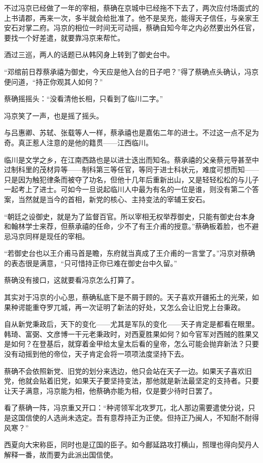 不过冯京已经做了一年的宰相，蔡确在京城中已经拖不下去了，两次应付场面式的上书请郡，再来一次，多半就会给批准了。他不是吴充，能得天子信任，与亲家王安石对掌二府。冯京的相位一时间无可动摇，蔡确自知今年之内必然要出外任官，要找一个好差遣，就要靠冯京来帮忙。

酒过三巡，两人的话题已从韩冈身上转到了御史台中。

“邓绾前日荐蔡承禧为御史，今天应是他入台的日子吧？”得了蔡确点头确认，冯京便问道，“持正你观其人如何？”

蔡确摇摇头：“没看清他长相，只看到了临川二字。”

冯京笑了一声，也是摇了摇头。

与吕惠卿、苏轼、张载等人一样，蔡承禧也是嘉佑二年的进士。不过这一点不足为奇。真正惹人注意的是他的籍贯——江西临川。

临川是文学之乡，在江南西路也是以进士迭出而知名。蔡承禧的父亲蔡元导甚至中过制科里的茂材异等——制科第三等任官，等同于进士科状元，难度可想而知——只是因为触犯律条而被夺了功名，但他十几年后重新出山，又是轻轻松松的与儿子一起考上了进士。可如今一旦说起临川人中最为有名的一位是谁，则没有第二个答案，当然就是当今的首相，新党的核心、主持变法的宰辅王安石。

“朝廷之设御史，就是为了监督百官。所以宰相无权举荐御史，只能有御史台本身和翰林学士来荐，但蔡承禧的任命，少不了有王介甫的授意。”蔡确板着脸，也不避忌冯京同样是现任的宰相。

“若御史台也以王介甫马首是瞻，东府就当真成了王介甫的一言堂了。”冯京对蔡确的表态很是满意，“只可惜持正你已难在御史台中久留。”

蔡确没有接口，这就要看冯京怎么打算了。

其实对于冯京的小心思，蔡确私底下是不屑于顾的。天子喜欢开疆拓土的光荣，如果种谔能重夺罗兀城，再一次证明了新法的好处，又怎么会让旧党上台秉政。

自从新党秉政后，天下的变化——尤其是军队的变化——天子肯定是都看在眼里。韩琦、富弼、文彦博一干元老秉政时，对西夏胜果如何？如今官军对西贼的胜果又是如何？在登基后，就穿着金甲给太皇太后看的皇帝，怎么可能会抛弃新法？只要没有动摇到他的帝位，天子肯定会将一项项法度坚持下去。

蔡确不会依照新党、旧党的划分来选边，他只会站在天子一边。如果天子喜欢旧党，他就会贴着旧党，如果天子要坚持变法，那他就是新法最坚定的支持者。只要让天子满意，冯京能为相，他蔡确亦能为相，仅是要少待时日罢了。

看了蔡确一阵，冯京重又开口：“种谔领军北攻罗兀，北人那边需要遣使分说，只是这国信使的人选尚未选定。吾有意荐持正为正使。但持正乃闽人，不知耐不耐得风寒？”

西夏向大宋称臣，同时也是辽国的臣子。如今鄜延路攻打横山，照理也得向契丹人解释一番，故而要为此派出国信使。


